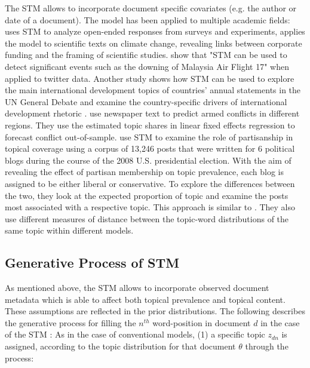 \documentclass[12pt,a4paper,notitlepage]{article}
\begin{document}
The STM allows to incorporate document specific covariates (e.g. the author or date of a document). The model has been applied to multiple academic fields: \citet{roberts_structural_2014} uses STM to analyze open-ended responses from surveys and experiments, \citet{farrell_corporate_2016} applies the model to scientific texts on climate change, revealing links between corporate funding and the framing of scientific studies. \citet{mishler_using_2015} show that "STM can be used to detect significant events such as the downing of Malaysia Air Flight 17" when applied to twitter data. Another study shows how STM can be used to explore the main international development topics of countries’ annual statements in the UN General Debate and examine the country-specific drivers of international development rhetoric \citep{baturo_what_2017}. \citet{mueller_reading_2016} use newspaper text to predict armed conflicts in different regions. They use the estimated topic shares in linear fixed effects regression to forecast conflict out-of-sample. \citet{roberts_navigating_2016} use STM to examine the role of partisanship in topical coverage using a corpus of 13,246 posts that were written for 6 political blogs during the course of the 2008 U.S. presidential election. With the aim of revealing the effect of partisan membership on topic prevalence, each blog is assigned to be either liberal or conservative. To explore the differences between the two, they look at the expected proportion of topic and examine the posts most associated with a respective topic. This approach is similar to \citet{roberts_model_2016}. They also use different measures of distance between the topic-word distributions of the same topic within different models.

\subsection{Generative Process of STM}\label{ch_generativeProcess}

 As mentioned above, the STM allows to incorporate observed document metadata which is able to affect both topical prevalence and topical content. These assumptions are reflected in the prior distributions. The following describes the generative process for filling the $n^{th}$ word-position in document $d$ in the case of the STM \citep{roberts_structural_2013}: As in the case of conventional models, (1) a specific topic $z_{dn}$ is assigned, according to the topic distribution for that document $\theta$ through the process:
\end{document}
